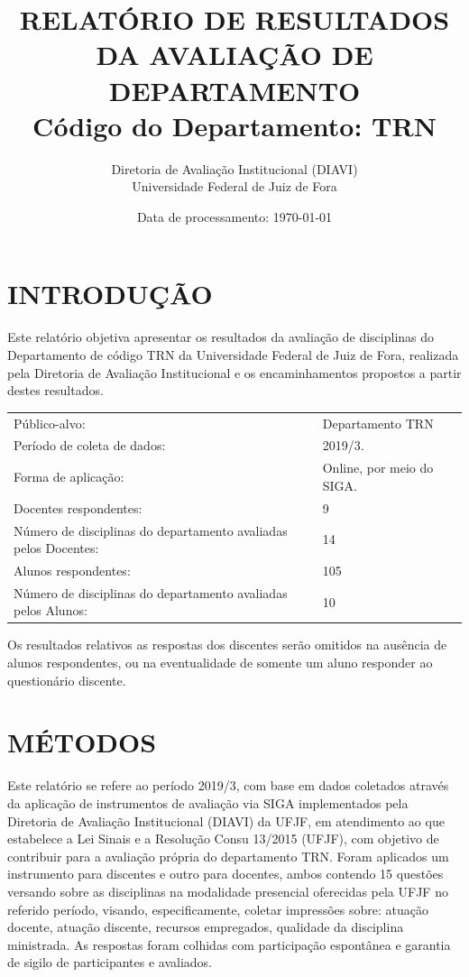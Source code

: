 \documentclass[a4paper,10pt]{article}
\date{Data de processamento: \today}
\begin{document}
\author{Diretoria de Avaliação Institucional (DIAVI) \\ Universidade Federal de Juiz de Fora}

\title{RELATÓRIO DE RESULTADOS DA AVALIAÇÃO DE DEPARTAMENTO\\ Código do Departamento: TRN}
\maketitle
\section{INTRODUÇÃO}
Este relatório objetiva apresentar os resultados da avaliação de disciplinas do Departamento     de código TRN da Universidade Federal de Juiz de Fora, realizada pela     Diretoria de Avaliação Institucional e os encaminhamentos propostos a     partir destes resultados.

\begin{center}
\begin{tabularx}{\linewidth}{X|l}

Público-alvo:& Departamento  TRN\\

Período de coleta de dados:& 2019/3.\\

Forma de aplicação:& Online, por meio do SIGA.\\

Docentes respondentes:& 9\\

Número de disciplinas do departamento avaliadas pelos Docentes:& 14\\

Alunos   respondentes:& 105\\

Número de disciplinas do departamento  avaliadas pelos   Alunos:& 10\\
\end{tabularx}
\end{center}

Os resultados relativos as respostas dos discentes serão omitidos na ausência de alunos respondentes, ou na eventualidade de somente um aluno responder ao questionário discente.
\section{MÉTODOS}
Este relatório se refere ao período 2019/3, com base em dados     coletados através da aplicação de instrumentos de avaliação via SIGA     implementados pela Diretoria de Avaliação Institucional (DIAVI) da UFJF, em atendimento     ao que estabelece a Lei Sinais e a Resolução Consu 13/2015 (UFJF),     com objetivo de contribuir para a avaliação própria do departamento TRN.    Foram aplicados um instrumento para discentes e outro para docentes, ambos contendo     15 questões versando sobre as disciplinas na modalidade presencial oferecidas pela UFJF no     referido período, visando, especificamente, coletar impressões sobre: atuação docente, atuação discente,     recursos empregados, qualidade da disciplina ministrada.     As respostas foram colhidas      com participação espontânea e garantia de    sigilo de participantes e avaliados.
\end{document}
